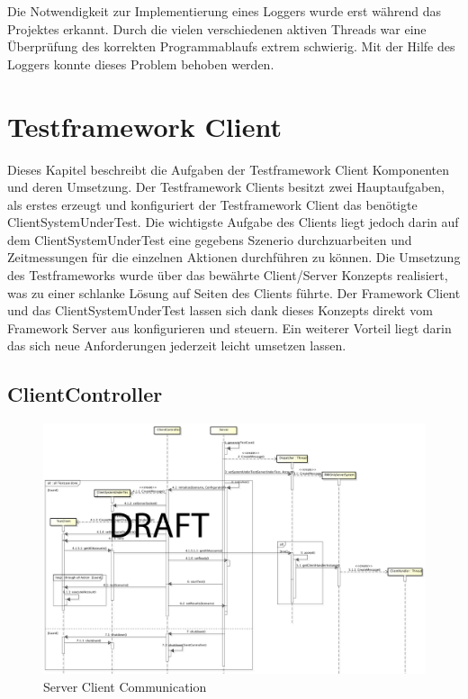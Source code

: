 Die Notwendigkeit zur Implementierung eines Loggers wurde erst während das Projektes erkannt. Durch die vielen verschiedenen aktiven Threads war eine Überprüfung des korrekten Programmablaufs extrem schwierig. Mit der Hilfe des Loggers konnte dieses Problem behoben werden.

\section{Testframework Client}
\label{sec:test-FW Client}
Dieses Kapitel beschreibt die Aufgaben der Testframework Client Komponenten und deren Umsetzung. Der Testframework Clients besitzt zwei Hauptaufgaben, als erstes erzeugt und konfiguriert der Testframework Client das benötigte ClientSystemUnderTest. Die wichtigste Aufgabe des Clients liegt jedoch darin auf dem ClientSystemUnderTest eine gegebens Szenerio durchzuarbeiten und Zeitmessungen für die einzelnen Aktionen durchführen zu können. Die Umsetzung des Testframeworks wurde über das bewährte Client/Server Konzepts realisiert, was zu einer schlanke Lösung auf Seiten des Clients führte. Der Framework Client und das ClientSystemUnderTest lassen sich dank dieses Konzepts direkt vom Framework Server aus konfigurieren und steuern. Ein weiterer Vorteil liegt darin das sich neue Anforderungen jederzeit leicht umsetzen lassen.


\subsection{ClientController}
\label{sec:clientController}


\begin{figure}
\begin{center}
\includegraphics[scale=0.2]{image_testFramework/TestFWServerClientSeq.png}
\end{center}
\caption{Server Client Communication}
\label{labelname}
\end{figure}
 
